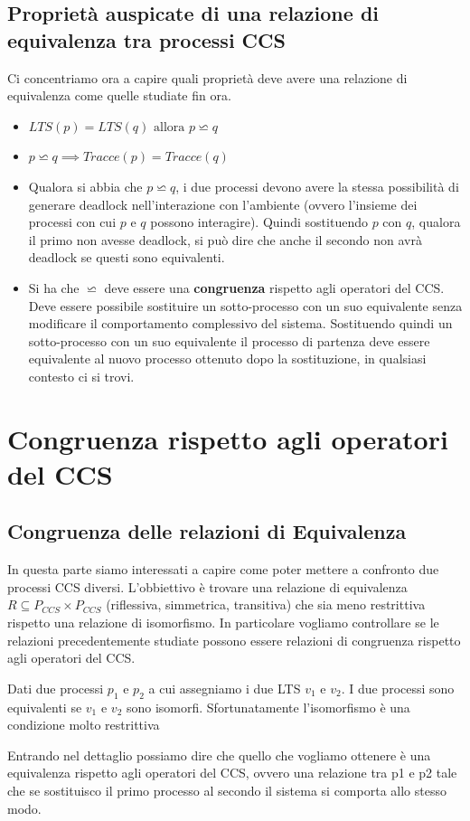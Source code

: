  \subsection{Proprietà auspicate di una relazione di equivalenza tra processi CCS}
Ci concentriamo ora a capire quali proprietà deve avere una relazione di equivalenza come quelle studiate fin ora.
\begin{itemize}
    \item $LTS(p)=LTS(q)\mbox{ allora } p\backsimeq q$
    \item $p\backsimeq q\implies Tracce(p)=Tracce(q)$
    \item Qualora si abbia che $p\backsimeq
      q$, i due processi devono avere la stessa possibilità di generare deadlock
      nell'interazione con l'ambiente (ovvero l'insieme dei processi con cui $p$ e
      $q$ possono interagire). Quindi sostituendo $p$ con $q$, qualora il
      primo non avesse deadlock, si può dire che anche il secondo non avrà deadlock
      se questi sono equivalenti.
      \item Si ha che $\backsimeq$ deve essere una \textbf{congruenza} rispetto agli
  operatori del CCS. Deve essere possibile sostituire un sotto-processo con un
  suo equivalente senza modificare il comportamento complessivo del
  sistema. Sostituendo quindi un sotto-processo con un suo equivalente il
  processo di partenza deve essere equivalente al nuovo processo ottenuto dopo
  la sostituzione, in qualsiasi contesto ci si trovi.
\end{itemize}

\section{Congruenza rispetto agli operatori del CCS}
\subsection{Congruenza delle relazioni di Equivalenza}
In questa parte siamo interessati a capire come poter mettere a confronto due processi CCS
diversi. L’obbiettivo è trovare una relazione di equivalenza $R\subseteq P_{CCS}\times P_{CCS}$ (riflessiva, simmetrica, transitiva) che
sia meno restrittiva rispetto una relazione di isomorfismo. In particolare vogliamo controllare se le relazioni precedentemente studiate possono essere relazioni di congruenza rispetto agli operatori del CCS.
\begin{nota}
 Dati due processi $p_1$ e $p_2$ a cui assegniamo i due LTS $v_1$ e $v_2$. I
  due processi sono equivalenti se $v_1$ e $v_2$ sono isomorfi. Sfortunatamente l'isomorfismo è una condizione molto restrittiva
\end{nota}
Entrando nel dettaglio possiamo dire che quello che vogliamo ottenere è una equivalenza rispetto
agli operatori del CCS, ovvero una relazione tra p1 e p2 tale che se sostituisco il primo processo
al secondo il sistema si comporta allo stesso modo.

